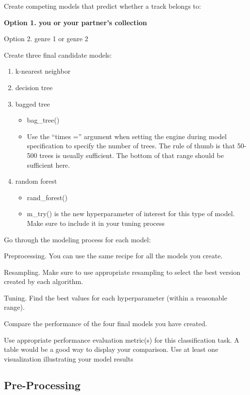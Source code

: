 \documentclass[
]{article}
\providecommand{\tightlist}{%
  \setlength{\itemsep}{0pt}\setlength{\parskip}{0pt}}
\begin{document}
Create competing models that predict whether a track belongs to:

\textbf{Option 1. you or your partner's collection}

Option 2. genre 1 or genre 2

Create three final candidate models:

\begin{enumerate}
\def\labelenumi{\arabic{enumi}.}
\tightlist
\item
  k-nearest neighbor
\item
  decision tree
\item
  bagged tree

  \begin{itemize}
  \tightlist
  \item
    bag\_tree()
  \item
    Use the ``times ='' argument when setting the engine during model
    specification to specify the number of trees. The rule of thumb is
    that 50-500 trees is usually sufficient. The bottom of that range
    should be sufficient here.\\
  \end{itemize}
\item
  random forest

  \begin{itemize}
  \tightlist
  \item
    rand\_forest()
  \item
    m\_try() is the new hyperparameter of interest for this type of
    model. Make sure to include it in your tuning process
  \end{itemize}
\end{enumerate}

Go through the modeling process for each model:

Preprocessing. You can use the same recipe for all the models you
create.

Resampling. Make sure to use appropriate resampling to select the best
version created by each algorithm.

Tuning. Find the best values for each hyperparameter (within a
reasonable range).

Compare the performance of the four final models you have created.

Use appropriate performance evaluation metric(s) for this classification
task. A table would be a good way to display your comparison. Use at
least one visualization illustrating your model results

\hypertarget{pre-processing}{%
\subsection{Pre-Processing}\label{pre-processing}}
\end{document}
